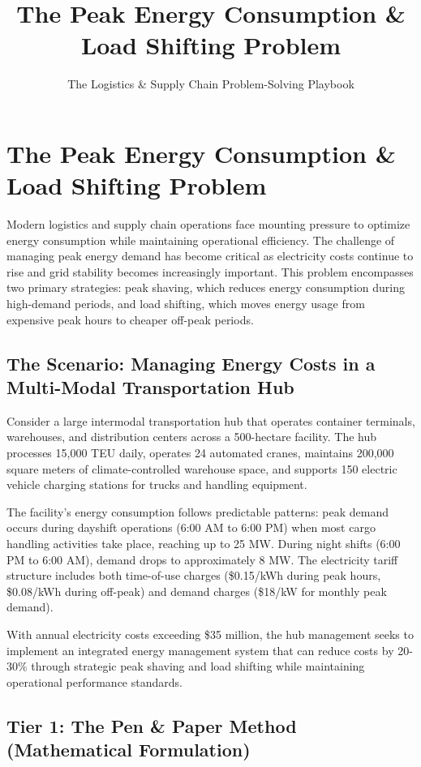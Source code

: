 \documentclass{article}
\title{The Peak Energy Consumption \& Load Shifting Problem}
\author{The Logistics \& Supply Chain Problem-Solving Playbook}
\date{}
\begin{document}
\maketitle

\section{The Peak Energy Consumption \& Load Shifting Problem}

Modern logistics and supply chain operations face mounting pressure to optimize energy consumption while maintaining operational efficiency. The challenge of managing peak energy demand has become critical as electricity costs continue to rise and grid stability becomes increasingly important. This problem encompasses two primary strategies: peak shaving, which reduces energy consumption during high-demand periods, and load shifting, which moves energy usage from expensive peak hours to cheaper off-peak periods.

\subsection{The Scenario: Managing Energy Costs in a Multi-Modal Transportation Hub}

Consider a large intermodal transportation hub that operates container terminals, warehouses, and distribution centers across a 500-hectare facility. The hub processes 15,000 TEU daily, operates 24 automated cranes, maintains 200,000 square meters of climate-controlled warehouse space, and supports 150 electric vehicle charging stations for trucks and handling equipment.

The facility's energy consumption follows predictable patterns: peak demand occurs during dayshift operations (6:00 AM to 6:00 PM) when most cargo handling activities take place, reaching up to 25 MW. During night shifts (6:00 PM to 6:00 AM), demand drops to approximately 8 MW. The electricity tariff structure includes both time-of-use charges (\$0.15/kWh during peak hours, \$0.08/kWh during off-peak) and demand charges (\$18/kW for monthly peak demand).

With annual electricity costs exceeding \$35 million, the hub management seeks to implement an integrated energy management system that can reduce costs by 20-30\% through strategic peak shaving and load shifting while maintaining operational performance standards.

\subsection{Tier 1: The Pen \& Paper Method (Mathematical Formulation)}
\end{document}
